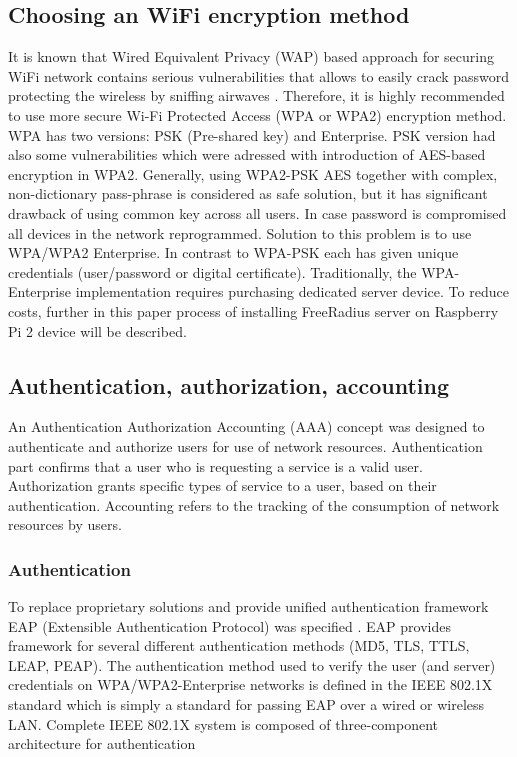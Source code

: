 \documentclass{llncs}
\begin{document}
\subsection{Choosing an WiFi encryption method}
It is known that Wired Equivalent Privacy (WAP) based approach for securing WiFi network contains serious vulnerabilities that allows to easily crack password protecting the wireless by sniffing airwaves
\cite{WebDeadAgain}. Therefore, it is highly recommended to use more secure Wi-Fi Protected Access (WPA or WPA2) encryption method. WPA has two versions: PSK (Pre-shared key) and Enterprise. PSK version had also some vulnerabilities \cite{WpaPskVulnerabilities} which were adressed with introduction of AES-based encryption in WPA2. Generally, using WPA2-PSK AES together with complex, non-dictionary pass-phrase is considered as safe solution, but it has significant drawback of using common key across all users.
In case password is compromised all devices in the network reprogrammed. Solution to this problem is to use WPA/WPA2 Enterprise. In contrast to WPA-PSK each has given unique credentials (user/password or digital certificate). Traditionally, the WPA-Enterprise implementation requires purchasing dedicated server device. To reduce costs, further in this paper process of installing FreeRadius server on Raspberry Pi 2 device will be described.

\subsection{Authentication, authorization, accounting}

An Authentication Authorization Accounting (AAA) \cite{rfc2903}\cite{rfc2904} concept was designed to authenticate and authorize users for use of network resources. Authentication part confirms that a user who is requesting a service is a valid user. Authorization grants specific types of service to a user, based on their authentication. Accounting refers to the tracking of the consumption of network resources by users.

\subsubsection{Authentication}

To replace proprietary solutions and provide unified authentication framework EAP (Extensible Authentication Protocol) was specified \cite{rfc3748}. EAP provides framework for several different authentication methods (MD5, TLS, TTLS, LEAP, PEAP). The authentication method used to verify the user (and server) credentials on WPA/WPA2-Enterprise networks is defined in the IEEE 802.1X standard which is simply a standard for passing EAP over a wired or wireless LAN. Complete IEEE 802.1X system is composed of three-component architecture for authentication   
\end{document}
